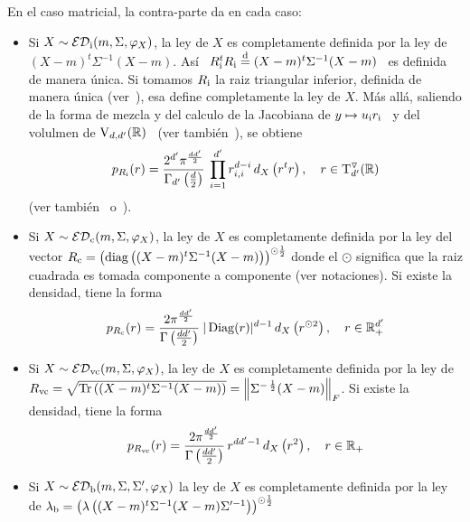 \begin{itemize}
  En el caso matricial, la contra-parte da en cada caso:
  \begin{itemize}
  \item Si $X \sim \mathcal{ED}_{\mathrm{i}}(m,\Sigma,\varphi_X)$, la ley de $X$ es completamente
    definida por la ley de $(X-m)^t \Sigma^{-1} (X-m)$. As\'i \ $R_{\mathrm{i}}^t R_{\mathrm{i}}
    \stackrel{\mathrm{d}}{=}  (X-m)^t \Sigma^{-1}  (X-m)$ \  es  definida de  manera \'unica.   Si
    tomamos  $R_{\mathrm{i}}$ la raiz  triangular inferior,  definida de  manera \'unica
    (ver~\cite{HorJoh13, Bha97}), esa define  completamente la ley de $X$. M\'as
    all\'a, saliendo de la  forma de mezcla y del calculo de  la Jacobiana de $y
    \mapsto   u_{\mathrm{i}}  r_{\mathrm{i}}$~\cite[Teo.~2.1.13]{Mui82}   y   del  volulmen   de
    $\mathrm{V}_{d,d'}(\mathbb{R})$~\cite[Teo.~2.1.15]{Mui82}                           (ver
    tambi\'en~\cite[p.~15-17]{GupNag99}), se obtiene
    \[
    p_{R_{\mathrm{i}}}(r)   =   \frac{2^{d'}   \pi^{\frac{d   d'}{2}}}{\Gamma_{d'}\left(
        \frac{d}{2} \right)} \:  \prod_{i=1}^{d'} r_{i,i}^{d-i} \, d_X\left( r^t
      r \right), \quad r \in \mathrm{T}^\triangledown_{d'}(\mathbb{R})
    \]
    (ver tambi\'en~\cite[Teo.~7.9.2]{And03} o~\cite{Dia13}).
  \item Si $X \sim \mathcal{ED}_{\mathrm{c}}(m,\Sigma,\varphi_X)$, la ley de $X$ es completamente
    definida  por  la  ley  del  vector $R_{\mathrm{c}}  =  \left(  \operatorname{diag}\left(  (X-m)^t
        \Sigma^{-1}  (X-m)  \right) \right)^{\odot  \frac12}$  donde el  $\odot$
    significa  que la  raiz  cuadrada  es tomada  componente  a componente  (ver
    notaciones). Si existe la densidad, tiene la forma
    \[
    p_{R_{\mathrm{c}}}(r)  = \frac{2  \pi^{\frac{d d'}{2}}}{\Gamma\left(  \frac{d d'}{2}
      \right)} \: |\operatorname{Diag}(r)|^{d-1} \, d_X\left( r^{\odot 2} \right), \quad r \in
    \mathbb{R}_+^{d'}
    \]
  \item   Si  $X  \sim   \mathcal{ED}_{\mathrm{vc}}(m,\Sigma,\varphi_X)$,  la   ley  de   $X$  es
    completamente  definida por  la ley  de $R_{\mathrm{vc}}  =  \sqrt{\operatorname{Tr}\left( (X-m)^t
        \Sigma^{-1}  (X-m)  \right)}  =  \left\|  \Sigma^{-  \,  \frac12}  (X-m)
    \right\|_F$. Si existe la densidad, tiene la forma
    \[
    p_{R_{\mathrm{vc}}}(r) =  \frac{2 \pi^{\frac{d d'}{2}}}{\Gamma\left(  \frac{d d'}{2}
      \right)} \, r^{d d'-1} \, d_X\left( r^2 \right), \quad r \in \mathbb{R}_+
    \]
  \item  Si  $X \sim  \mathcal{ED}_{\mathrm{b}}(m,\Sigma,\Sigma',\varphi_X)$  la  ley  de $X$  es
    completamente definida  por la ley  de $\lambda_{\mathrm{b}} =  \left( \lambda\left(
        (X-m)^t \Sigma^{-1} (X-m)  \Sigma'^{-1} \right) \right)^{\odot \frac12}$

\end{itemize}
\end{itemize}
